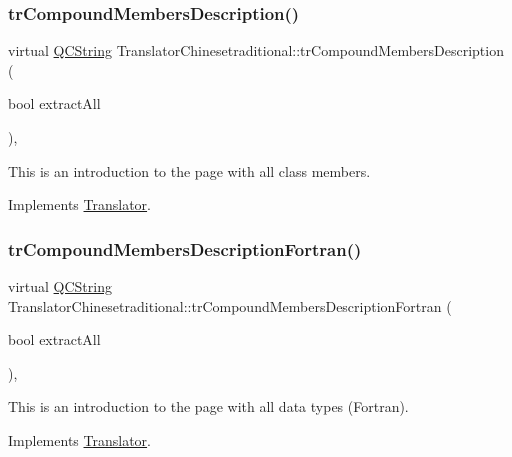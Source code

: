 \subsubsection{\texorpdfstring{trCompoundMembersDescription()}{trCompoundMembersDescription()}}
{\footnotesize\ttfamily virtual \mbox{\hyperlink{class_q_c_string}{Q\+C\+String}} Translator\+Chinesetraditional\+::tr\+Compound\+Members\+Description (\begin{DoxyParamCaption}\item[{bool}]{extract\+All }\end{DoxyParamCaption})\hspace{0.3cm}{\ttfamily [inline]}, {\ttfamily [virtual]}}

This is an introduction to the page with all class members. 

Implements \mbox{\hyperlink{class_translator}{Translator}}.

\mbox{\label{class_translator_chinesetraditional_a94e67a603f3cc7363b43c2a59fb2c768}} 
\subsubsection{\texorpdfstring{trCompoundMembersDescriptionFortran()}{trCompoundMembersDescriptionFortran()}}
{\footnotesize\ttfamily virtual \mbox{\hyperlink{class_q_c_string}{Q\+C\+String}} Translator\+Chinesetraditional\+::tr\+Compound\+Members\+Description\+Fortran (\begin{DoxyParamCaption}\item[{bool}]{extract\+All }\end{DoxyParamCaption})\hspace{0.3cm}{\ttfamily [inline]}, {\ttfamily [virtual]}}

This is an introduction to the page with all data types (Fortran). 

Implements \mbox{\hyperlink{class_translator}{Translator}}.

\mbox{\label{class_translator_chinesetraditional_a8ee7e0f388ea12d59b3759558f796513}} 
